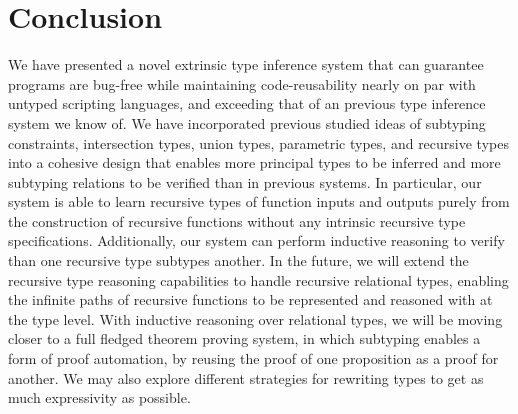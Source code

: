 \documentclass[table,dvipsnames,acmsmall]{acmart}
\theoremstyle{definition}
\begin{document}
\section{Conclusion}
\label{sec:conclusion}
We have presented a novel extrinsic type inference system
that can guarantee programs are bug-free while maintaining
code-reusability nearly on par with untyped scripting languages,
and exceeding that of an previous type inference system we know of.  
We have incorporated previous studied ideas of subtyping constraints,
intersection types, union types, parametric types, and recursive types into
a cohesive design that enables more principal types to be inferred 
and more subtyping relations to be verified than in previous systems. 
In particular, our system is able to learn recursive types of function inputs
and outputs purely from the construction of recursive functions without 
any intrinsic recursive type specifications.
Additionally, our system can perform inductive reasoning to
verify than one recursive type subtypes another.
In the future, we will extend the recursive type reasoning capabilities
to handle recursive relational types, enabling the infinite paths
of recursive functions to be represented and reasoned with at the type level. 
With inductive reasoning over relational types, we will be
moving closer to a full fledged theorem proving system,
in which subtyping enables a form of proof automation,
by reusing the proof of one proposition as a proof for another. 
We may also explore different strategies for rewriting types 
to get as much expressivity as possible.


\newpage

\begin{thebibliography}{9}




\end{thebibliography}
\end{document}
